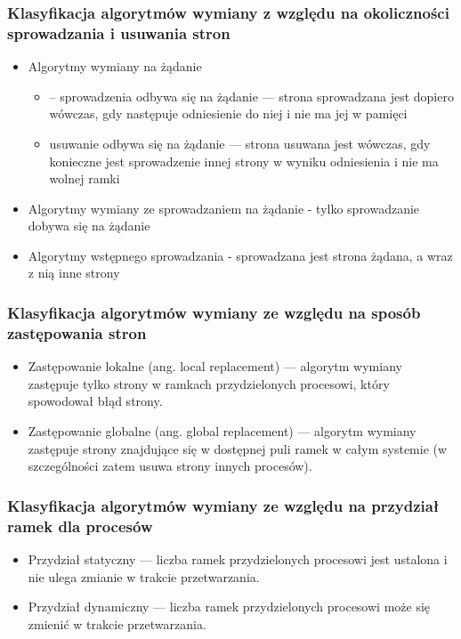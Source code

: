 \documentclass[main.tex]{subfiles}
\begin{document}
    \subsubsection{Klasyfikacja algorytmów wymiany z względu na okoliczności sprowadzania i usuwania stron}
    \begin{itemize}
        \item Algorytmy wymiany na żądanie
        \begin{itemize}
            \item – sprowadzenia odbywa się na żądanie — strona sprowadzana jest dopiero wówczas, gdy następuje odniesienie do niej i nie ma
            jej w pamięci
            \item usuwanie odbywa się na żądanie — strona usuwana jest wówczas, gdy konieczne jest sprowadzenie innej strony w wyniku
            odniesienia i nie ma wolnej ramki
        \end{itemize}
        \item Algorytmy wymiany ze sprowadzaniem na żądanie - tylko sprowadzanie dobywa się na żądanie
        \item Algorytmy wstępnego sprowadzania - sprowadzana jest strona żądana, a wraz z nią inne strony
    \end{itemize}

    \subsubsection{Klasyfikacja algorytmów wymiany ze względu na sposób zastępowania stron}
    \begin{itemize}
        \item Zastępowanie lokalne (ang. local replacement) — algorytm wymiany zastępuje tylko strony w ramkach przydzielonych procesowi,
        który spowodował błąd strony.
        \item Zastępowanie globalne (ang. global replacement) — algorytm wymiany zastępuje strony znajdujące się w dostępnej puli ramek w
        całym systemie (w szczególności zatem usuwa strony innych procesów).
    \end{itemize}

    \subsubsection{Klasyfikacja algorytmów wymiany ze względu na przydział ramek dla procesów}
    \begin{itemize}
        \item Przydział statyczny — liczba ramek przydzielonych procesowi jest ustalona i nie ulega zmianie w trakcie przetwarzania.
        \item Przydział dynamiczny — liczba ramek przydzielonych procesowi może się zmienić w trakcie przetwarzania.
    \end{itemize}
\end{document}
